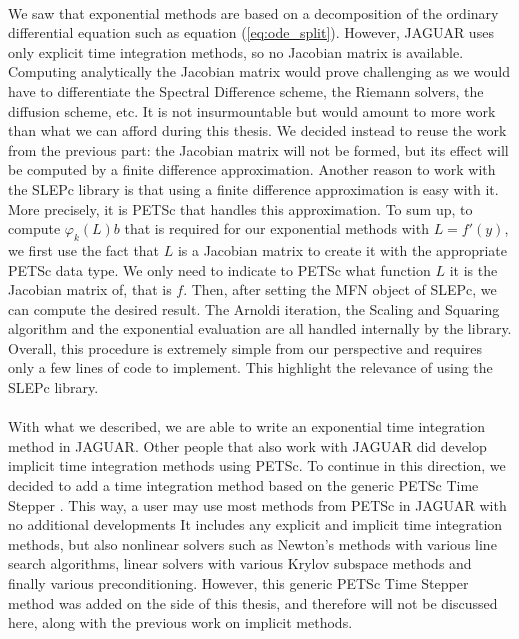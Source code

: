       \paragraph{}
      We saw that exponential methods are based on a decomposition of the ordinary differential equation such as equation (\ref{eq:ode_split}).
      However, JAGUAR uses only explicit time integration methods, so no Jacobian matrix is available.
      Computing analytically the Jacobian matrix would prove challenging as we would have to differentiate the Spectral Difference scheme, the Riemann solvers, the diffusion scheme, etc.
      It is not insurmountable but would amount to more work than what we can afford during this thesis.
      We decided instead to reuse the work from the previous part: the Jacobian matrix will not be formed, but its effect will be computed by a finite difference approximation.
      Another reason to work with the SLEPc library is that using a finite difference approximation is easy with it.
      More precisely, it is PETSc that handles this approximation.
      To sum up, to compute $\varphi_k\left(L\right)b$ that is required for our exponential methods with $L = f'\left(y\right)$, we first use the fact that $L$ is a Jacobian matrix to create it with the appropriate PETSc data type.
      We only need to indicate to PETSc what function $L$ it is the Jacobian matrix of, that is $f$.
      Then, after setting the MFN object of SLEPc, we can compute the desired result.
      The Arnoldi iteration, the Scaling and Squaring algorithm and the exponential evaluation are all handled internally by the library.
      Overall, this procedure is extremely simple from our perspective and requires only a few lines of code to implement.
      This highlight the relevance of using the SLEPc library.

      \paragraph{}
      With what we described, we are able to write an exponential time integration method in JAGUAR.
      Other people that also work with JAGUAR did develop implicit time integration methods using PETSc.
      To continue in this direction, we decided to add a time integration method based on the generic PETSc Time Stepper \cite{AbhyankarBrownConstantinescuEtAl2018}.
      This way, a user may use most methods from PETSc in JAGUAR with no additional developments
      It includes any explicit and implicit time integration methods, but also nonlinear solvers such as Newton's methods with various line search algorithms, linear solvers with various Krylov subspace methods and finally various preconditioning.
      However, this generic PETSc Time Stepper method was added on the side of this thesis, and therefore will not be discussed here, along with the previous work on implicit methods.


